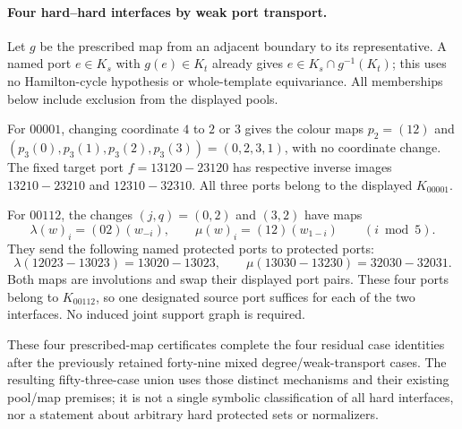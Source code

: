 \paragraph{Four hard--hard interfaces by weak port transport.}
Let $g$ be the prescribed map from an adjacent boundary to its
representative. A named port $e\in K_s$ with $g(e)\in K_t$
already gives $e\in K_s\cap g^{-1}(K_t)$; this uses no
Hamilton-cycle hypothesis or whole-template equivariance.
All memberships below include exclusion from the displayed pools.

For $00001$, changing coordinate $4$ to $2$ or $3$ gives the
colour maps $p_2=(12)$ and
$(p_3(0),p_3(1),p_3(2),p_3(3))=(0,2,3,1)$, with no coordinate
change. The fixed target port $f=13120\!-23120$ has respective
inverse images $13210\!-23210$ and $12310\!-32310$.
All three ports belong to the displayed $K_{00001}$.

For $00112$, the changes $(j,q)=(0,2)$ and $(3,2)$ have maps
\[
 \lambda(w)_i=(02)(w_{-i}),\qquad
 \mu(w)_i=(12)(w_{1-i})\qquad(i\bmod5).
\]
They send the following named protected ports to protected ports:
\[
 \lambda(12023\!-13023)=13020\!-13023,\qquad
 \mu(13030\!-13230)=32030\!-32031.
\]
Both maps are involutions and swap their displayed port pairs.
These four ports belong to $K_{00112}$, so one designated source
port suffices for each of the two interfaces. No induced joint
support graph is required.

These four prescribed-map certificates complete the four residual
case identities after the previously retained forty-nine mixed
degree/weak-transport cases. The resulting fifty-three-case union
uses those distinct mechanisms and their existing pool/map premises;
it is not a single symbolic classification of all hard interfaces,
nor a statement about arbitrary hard protected sets or normalizers.

